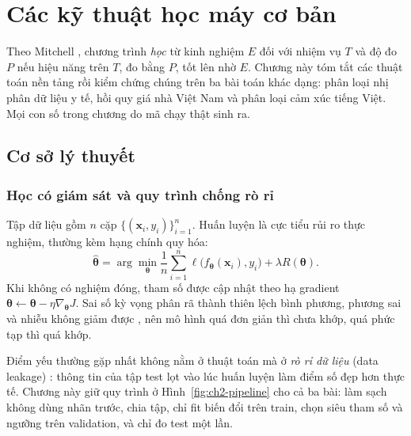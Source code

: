 \chapter{Các kỹ thuật học máy cơ bản}\label{chap:ml}

Theo Mitchell \cite{ch2:mitchell1997}, chương trình \emph{học} từ kinh nghiệm $E$ đối với nhiệm vụ $T$ và độ đo $P$ nếu hiệu năng trên $T$, đo bằng $P$, tốt lên nhờ $E$. Chương này tóm tắt các thuật toán nền tảng rồi kiểm chứng chúng trên ba bài toán khác dạng: phân loại nhị phân dữ liệu y tế, hồi quy giá nhà Việt Nam và phân loại cảm xúc tiếng Việt. Mọi con số trong chương do mã chạy thật sinh ra.

\section{Cơ sở lý thuyết}\label{sec:ml-theory}
\subsection{Học có giám sát và quy trình chống rò rỉ}
Tập dữ liệu gồm $n$ cặp $\{(\mathbf{x}_i,y_i)\}_{i=1}^n$. Huấn luyện là cực tiểu rủi ro thực nghiệm, thường kèm hạng chính quy hóa:
\begin{equation}
  \hat{\boldsymbol\theta}=\arg\min_{\boldsymbol\theta}\frac1n\sum_{i=1}^n\ell\big(f_{\boldsymbol\theta}(\mathbf{x}_i),y_i\big)+\lambda R(\boldsymbol\theta).
\end{equation}
Khi không có nghiệm đóng, tham số được cập nhật theo hạ gradient $\boldsymbol\theta\leftarrow\boldsymbol\theta-\eta\nabla_{\boldsymbol\theta}J$. Sai số kỳ vọng phân rã thành thiên lệch bình phương, phương sai và nhiễu không giảm được \cite{ch2:geman1992}, nên mô hình quá đơn giản thì chưa khớp, quá phức tạp thì quá khớp.

Điểm yếu thường gặp nhất không nằm ở thuật toán mà ở \emph{rò rỉ dữ liệu} (data leakage) \cite{ch2:kaufman2012}: thông tin của tập test lọt vào lúc huấn luyện làm điểm số đẹp hơn thực tế. Chương này giữ quy trình ở Hình~\ref{fig:ch2-pipeline} cho cả ba bài: làm sạch không dùng nhãn trước, chia tập, chỉ fit biến đổi trên train, chọn siêu tham số và ngưỡng trên validation, và chỉ đo test một lần.


